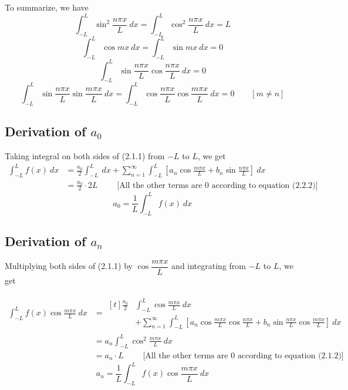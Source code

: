 \documentclass[12pt]{article}
\numberwithin{equation}{subsection}
\begin{document}
To summarize, we have
\begin{equation}
    \int_{-L}^{L} {\sin^2{\frac{n\pi x}{L}}} \: d{x} = \int_{-L}^{L} {\cos^2{\frac{n\pi x}{L}}} \: d{x} = L
\end{equation}
\begin{equation}
    \int_{-L}^{L} {\cos{mx}} \: d{x} = \int_{-L}^{L} {\sin{mx}} \: d{x} = 0
\end{equation}
\begin{equation}
    \int_{-L}^{L} {\sin{\frac{n\pi x}{L}}\cos{\frac{n\pi x}{L}}} \: d{x} = 0
\end{equation}
\begin{equation}
    \int_{-L}^{L} {\sin{\frac{n\pi x}{L}}\sin{\frac{m\pi x}{L}}} \: d{x} = \int_{-L}^{L} {\cos{\frac{n\pi x}{L}}\cos{\frac{m\pi x}{L}}} \: d{x} = 0 \qquad [m \neq n]
\end{equation}

\subsection{Derivation of $a_0$}
Taking integral on both sides of (2.1.1) from $-L$ to $L$, we get
\begin{align*}
    \int_{-L}^{L} {f(x)} \: d{x} &= \frac{a_0}{2} \int_{-L}^{L} {} \: d{x} + \sum_{n=1}^{\infty} \int_{-L}^{L} \left[ a_n \cos{\frac{m\pi x}{L}} + b_n \sin{\frac{n\pi x}{L}} \right] \: d{x} \\
    &= \frac{a_0}{2} \cdot 2L \qquad \text{ [All the other terms are $0$ according to equation (2.2.2)] }
\end{align*}
\[ \boxed{ a_0 = \frac{1}{L} \int_{-L}^{L} {f(x)} \: d{x} } \]

\subsection{Derivation of $a_n$}
Multiplying both sides of (2.1.1) by $\cos{\dfrac{m\pi x}{L}}$ and integrating from $-L$ to $L$, we get

\begin{align*}
    \int_{-L}^{L} {f(x) \cos{\frac{m\pi x}{L}}} \: d{x} &=
    \begin{aligned}[t]
        \frac{a_0}{2} &\int_{-L}^{L} {\cos{\frac{m\pi x}{L}}} \: d{x} \\
        & + \sum_{n=1}^{\infty} \int_{-L}^{L} \left[ a_n \cos{\frac{m\pi x}{L}} \cos{\frac{n\pi x}{L}} + b_n \sin{\frac{n\pi x}{L}} \cos{\frac{m\pi x}{L}} \right] \: d{x}
    \end{aligned} \\
    &= a_n \int_{-L}^{L} {\cos^2{\frac{m\pi x}{L}}} \: d{x} \\
    &= a_n \cdot L \qquad \text{ [All the other terms are $0$ according to equation (2.1.2)] }
\end{align*}
\[ \boxed{ a_n = \frac{1}{L} \int_{-L}^{L} {f(x) \cos{\frac{m\pi x}{L}}} \: d{x} } \]
\end{document}

